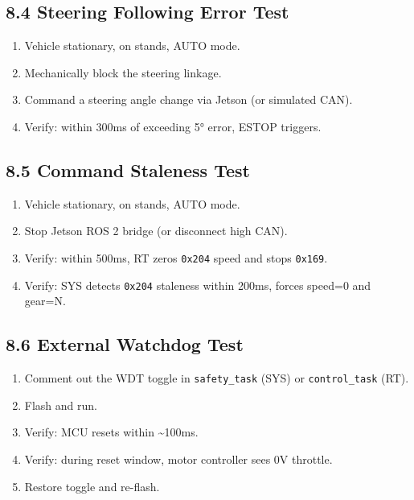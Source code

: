 \documentclass[12pt,a4paper,oneside]{report}
\providecommand{\tightlist}{\setlength{\itemsep}{0pt}\setlength{\parskip}{0pt}}
\begin{document}
\subsection{8.4 Steering Following Error
Test}\label{steering-following-error-test}

\begin{enumerate}
\def\labelenumi{\arabic{enumi}.}
\tightlist
\item
  Vehicle stationary, on stands, AUTO mode.
\item
  Mechanically block the steering linkage.
\item
  Command a steering angle change via Jetson (or simulated CAN).
\item
  Verify: within 300ms of exceeding 5° error, ESTOP triggers.
\end{enumerate}

\subsection{8.5 Command Staleness Test}\label{command-staleness-test}

\begin{enumerate}
\def\labelenumi{\arabic{enumi}.}
\tightlist
\item
  Vehicle stationary, on stands, AUTO mode.
\item
  Stop Jetson ROS 2 bridge (or disconnect high CAN).
\item
  Verify: within 500ms, RT zeros \texttt{0x204} speed and stops \texttt{0x169}.
\item
  Verify: SYS detects \texttt{0x204} staleness within 200ms, forces speed=0 and
  gear=N.
\end{enumerate}

\subsection{8.6 External Watchdog Test}\label{external-watchdog-test}

\begin{enumerate}
\def\labelenumi{\arabic{enumi}.}
\tightlist
\item
  Comment out the WDT toggle in \texttt{safety\_task} (SYS) or
  \texttt{control\_task} (RT).
\item
  Flash and run.
\item
  Verify: MCU resets within \textasciitilde100ms.
\item
  Verify: during reset window, motor controller sees 0V throttle.
\item
  Restore toggle and re-flash.
\end{enumerate}
\end{document}
